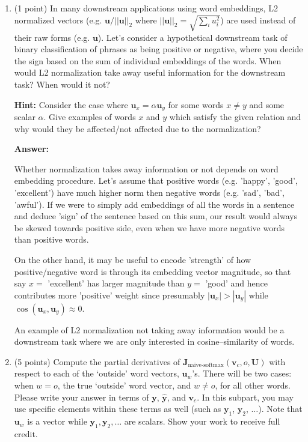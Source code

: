 \documentclass{article}
\newenvironment{answer}{
    {\bf Answer:} \sf \begingroup\color{red}
}{\endgroup}%
\begin{document}
\begin{enumerate}[label=(\alph*)]
\item (1 point) In many downstream applications using word embeddings, L2 normalized vectors (e.g. $\mathbf{u}/||\mathbf{u}||_2$ where $||\mathbf{u}||_2 = \sqrt{\sum_i u_i^2}$) are used instead of their raw forms (e.g. $\mathbf{u}$). Let’s consider a hypothetical downstream task of binary classification of phrases as being positive or negative, where you decide the sign based on the sum of individual embeddings of the words. When would L2 normalization take away useful information for the downstream task? When would it not?

\textbf{Hint:} Consider the case where $\mathbf{u}_x = \alpha\mathbf{u}_y$ for some words $x \neq y$ and some scalar $\alpha$. Give examples of words $x$ and $y$ which satisfy the given relation and why would they be affected/not affected due to the normalization?

\begin{shaded}
\begin{answer}
Whether normalization takes away information or not depends on word embedding procedure. Let's assume that positive words (e.g. 'happy', 'good', 'excellent') have much higher norm then negative words (e.g. 'sad', 'bad', 'awful'). If we were to simply add embeddings of all the words in a sentence and deduce 'sign' of the sentence based on this sum, our result would always be skewed towards positive side, even when we have more negative words than positive words.

On the other hand, it may be useful to encode 'strength' of how positive/negative word is through its embedding vector magnitude, so that say $x=$ 'excellent' has larger magnitude than $y=$ 'good' and hence contributes more 'positive' weight since presumably $|\bm u_x | > |\bm u_y|$ while $\cos(\bm u_x, \bm u_y) \approx 0$.

An example of L2 normalization not taking away information would be a downstream task where we are only interested in cosine--similarity of words.
\end{answer}
\end{shaded}

\item (5 points) Compute the partial derivatives of $\bm J_{\text{naive-softmax}}(\bm v_c, o, \bm U)$ with respect to each of the `outside' word vectors, $\bm u_w$'s. There will be two cases: when $w=o$, the true `outside' word vector, and $w \neq o$, for all other words. Please write your answer in terms of $\bm y$, $\hat{\bm y}$, and $\bm v_c$. In this subpart, you may use specific elements within these terms as well (such as $\bm y_1$, $\bm y_2$, $\dots$). Note that $\bm u_w$ is a vector while $\bm y_1, \bm y_2, \dots$ are scalars. Show your work to receive full credit.


\end{enumerate}
\end{document}
